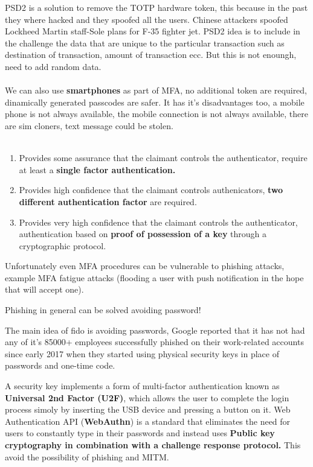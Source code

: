     PSD2 is a solution to remove the TOTP hardware token, this because in the past they where hacked and they spoofed all the users. Chinese attackers spoofed Lockheed Martin staff-Sole plans for F-35 fighter jet. PSD2 idea is to include in the challenge the data that are unique to the particular transaction such as destination of transaction, amount of transaction ecc. But this is not enoungh, need to add random data.
    \\\\
    We can also use \textbf{smartphones} as part of MFA, no additional token are required, dinamically generated passcodes are safer. It has it's disadvantages too, a mobile phone is not always available, the mobile connection is not always available, there are sim cloners, text message could be stolen.
    \\\\
    \begin{enumerate}
        \item Provides some assurance that the claimant controls the authenticator, require at least a \textbf{single factor authentication.}
        \item Provides high confidence that the claimant controls authenicators, \textbf{two different authentication factor} are required.
        \item Provides very high confidence that the claimant controls the authenticator, authentication based on \textbf{proof of possession of a key} through a cryptographic protocol.
    \end{enumerate}
    
    Unfortunately even MFA procedures can be vulnerable to phishing attacks, example MFA fatigue attacks (flooding a user with push notification in the hope that will accept one).

    Phishing in general can be solved avoiding password!
    
    The main idea of fido is avoiding passwords, Google reported that it has not had any of it's 85000+ employees successfully phished on their work-related accounts since early 2017 when they started using physical security keys in place of passwords and one-time code.
    
    A security key implements a form of multi-factor authentication known as \textbf{Universal 2nd Factor (U2F)}, which allows the user to complete the login process simoly by inserting the USB device and pressing a button on it. Web Authentication API (\textbf{WebAuthn}) is a standard that eliminates the need for users to constantly type in their passwords and instead uses \textbf{Public key cryptography in combination with a challenge response protocol.} This avoid the possibility of phishing and MITM.
    

